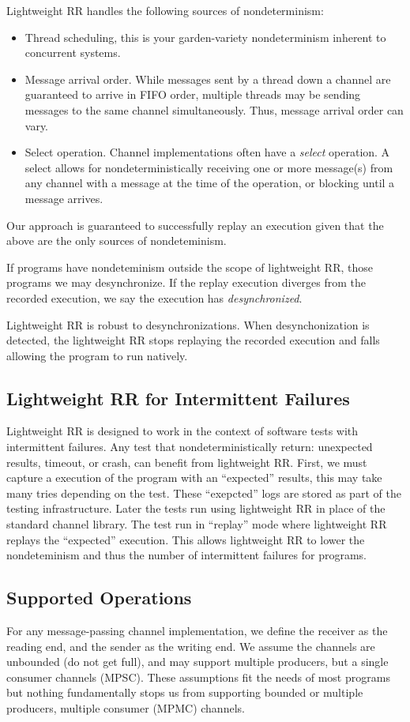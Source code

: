 \documentclass{article}
\begin{document}
Lightweight RR handles the following sources of nondeterminism:
\begin{itemize}
\item Thread scheduling, this is your garden-variety nondeterminism
  inherent to concurrent systems.
\item Message arrival order. While messages sent by a thread down a channel are guaranteed to arrive in FIFO order, multiple threads may be sending messages to the same channel simultaneously. Thus, message arrival order can vary.
\item Select operation. Channel implementations often have a \textit{select} operation. A select allows for nondeterministically receiving one or more message(s) from any channel with a message at the time of the operation, or blocking until a message arrives.
\end{itemize}

Our approach is guaranteed to successfully replay an execution given that the above are the only sources of nondeteminism.

If programs have nondeteminism outside the scope of lightweight RR, those programs we may desynchronize. If the replay execution diverges from the recorded execution, we say the execution has \textit{desynchronized}.

Lightweight RR is robust to desynchronizations. When desynchonization is detected, the lightweight RR stops replaying the recorded execution and falls allowing the program to run natively.

\subsection{Lightweight RR for Intermittent Failures}
Lightweight RR is designed to work in the context of software tests with intermittent
failures.
Any test that nondeterministically return: unexpected results, timeout, or crash, can
benefit from lightweight RR. First, we must capture a execution of the program with an
``expected'' results, this may take many tries depending on the test.
These ``exepcted'' logs are stored as part of the testing infrastructure. Later the
tests run using lightweight RR in place of the standard channel library. The test run
in ``replay'' mode where lightweight RR replays the ``expected'' execution. This allows
lightweight RR to lower the nondeteminism and thus the number of intermittent failures
for programs.

\subsection{Supported Operations}
For any message-passing channel implementation, we define the receiver as the reading end, and the sender as the writing end. We assume the channels are unbounded (do not get full), and may support multiple producers, but a single consumer channels (MPSC). These assumptions fit the needs of most programs but nothing fundamentally stops us from supporting bounded or multiple producers, multiple consumer (MPMC) channels.
\end{document}
